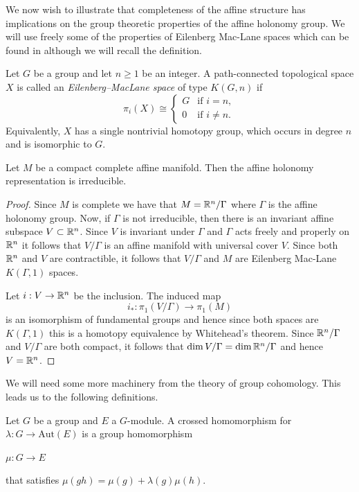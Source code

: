 We now wish to illustrate that completeness of the affine structure has
implications on the group theoretic properties of the affine holonomy group. We
will use freely some of the properties of Eilenberg Mac-Lane spaces which can
be found in \cite{Hatcher} although we will recall the definition.
\begin{definition}\label{def:eilenberg-mac}
    Let $G$ be a group and let $n \geq 1$ be an integer. A path-connected topological space $X$ is called an \emph{Eilenberg--MacLane space} of type $K(G,n)$ if
    \[
        \pi_i(X) \cong
        \begin{cases}
            G & \text{if } i = n,    \\
            0 & \text{if } i \neq n.
        \end{cases}
    \]
    Equivalently, $X$ has a single nontrivial homotopy group, which occurs in
    degree $n$ and is isomorphic to $G$.
\end{definition}

\begin{theorem}\label{thm:complete-implies-irreducible}
    Let $M$ be a compact complete affine manifold. Then the affine holonomy representation is irreducible.
\end{theorem}
\begin{proof}
    Since $M$ is complete we have that $M = \mathbb{R}^n/\Gamma$ where $\Gamma$ is the affine holonomy group. Now, if $\Gamma$ is not
    irreducible, then there is an invariant affine subspace $V \subset \mathbb{R}^n$. Since $V$ is invariant under $\Gamma$ and $\Gamma$
    acts freely and properly on $\mathbb{R}^n$ it follows that $V/\Gamma$ is an affine manifold with universal cover $V$. Since both $\mathbb{R}^n$ and
    $V$ are contractible, it follows that $V/\Gamma$ and $M$ are Eilenberg Mac-Lane $K(\Gamma, 1)$ spaces.

    Let $i: V \to \mathbb{R}^n$ be the inclusion. The induced map $$ i_* : \pi_1(V/\Gamma)
        \to \pi_1(M) $$ is an isomorphism of fundamental groups and hence since both
    spaces are $K(\Gamma, 1)$ this is a homotopy equivalence by Whitehead's
    theorem. Since $\mathbb{R}^n / \Gamma$ and $V/\Gamma$ are both compact, it follows that
    $\dim V/ \Gamma = \dim \mathbb{R}^n/\Gamma$ and hence $V = \mathbb{R}^n$.
\end{proof}

We will need some more machinery from the theory of group cohomology. This
leads us to the following definitions.

\begin{definition}
    Let $G$ be a group and $E$ a $G$-module. A crossed homomorphism for $\lambda : G \to \text{Aut}(E)$ is a group homomorphism
    \begin{center}
        $\mu: G \to E$
    \end{center}
    that satisfies $\mu(gh) = \mu(g) + \lambda(g)\mu(h)$.
\end{definition}

